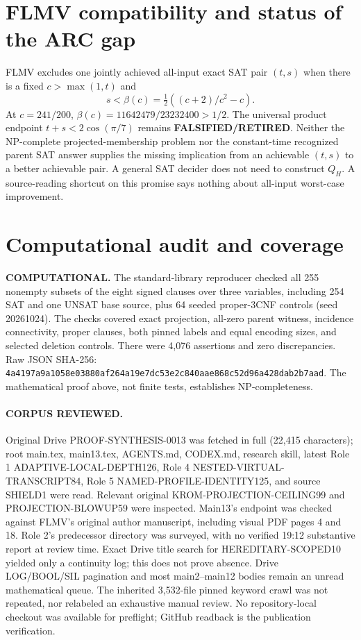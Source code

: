 \documentclass[11pt]{article}
\begin{document}
\section{FLMV compatibility and status of the ARC gap}
FLMV excludes one jointly achieved all-input exact SAT pair $(t,s)$ when there is a fixed $c>\max(1,t)$ and
\[
s<\beta(c)=\tfrac12((c+2)/c^2-c).
\]
At $c=241/200$, $\beta(c)=11642479/23232400>1/2$. The universal product endpoint $t+s<2\cos(\pi/7)$ remains \textbf{FALSIFIED/RETIRED}. Neither the NP-complete projected-membership problem nor the constant-time recognized parent SAT answer supplies the missing implication from an achievable $(t,s)$ to a better achievable pair. A general SAT decider does not need to construct $Q_H$. A source-reading shortcut on this promise says nothing about all-input worst-case improvement.

\section{Computational audit and coverage}
\textbf{COMPUTATIONAL.} The standard-library reproducer checked all 255 nonempty subsets of the eight signed clauses over three variables, including 254 SAT and one UNSAT base source, plus 64 seeded proper-3CNF controls (seed 20261024). The checks covered exact projection, all-zero parent witness, incidence connectivity, proper clauses, both pinned labels and equal encoding sizes, and selected deletion controls. There were 4,076 assertions and zero discrepancies. Raw JSON SHA-256:
\texttt{4a4197a9a1058e03880af264a19e7dc53e2c840aae868c52d96a428dab2b7aad}.
The mathematical proof above, not finite tests, establishes NP-completeness.

\paragraph{CORPUS REVIEWED.}
Original Drive PROOF-SYNTHESIS-0013 was fetched in full (22,415 characters); root main.tex, main13.tex, AGENTS.md, CODEX.md, research skill, latest Role 1 ADAPTIVE-LOCAL-DEPTH126, Role 4 NESTED-VIRTUAL-TRANSCRIPT84, Role 5 NAMED-PROFILE-IDENTITY125, and source SHIELD1 were read. Relevant original KROM-PROJECTION-CEILING99 and PROJECTION-BLOWUP59 were inspected. Main13's endpoint was checked against FLMV's original author manuscript, including visual PDF pages 4 and 18. Role 2's predecessor directory was surveyed, with no verified 19:12 substantive report at review time. Exact Drive title search for HEREDITARY-SCOPED10 yielded only a continuity log; this does not prove absence. Drive LOG/BOOL/SIL pagination and most main2--main12 bodies remain an unread mathematical queue. The inherited 3,532-file pinned keyword crawl was not repeated, nor relabeled an exhaustive manual review. No repository-local checkout was available for preflight; GitHub readback is the publication verification.
\end{document}
